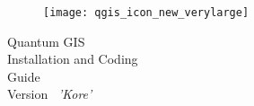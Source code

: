 
\begin{titlepage}
\begin{center}

\begin{figure}[H]
\begin{center}
\texttt{[image: qgis\_icon\_new\_verylarge]} 
\end{center}
\end{figure}

\Huge{Quantum GIS}\\
\vspace{0.5cm}
\Large{Installation and Coding \\Guide} \\
\vspace{0.5cm}
\Large{Version ~\CURRENT \textsl{'Kore'}}

\end{center}
\end{titlepage}
